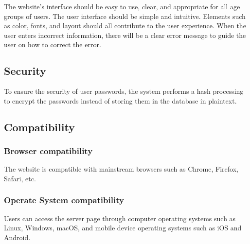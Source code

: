 \documentclass[conference]{IEEEtran}
\begin{document}
The website's interface should be easy to use, clear, and appropriate for all 
age groups of users. The user interface should be simple and intuitive. Elements 
such as color, fonts, and layout should all contribute to the user experience.
When the user enters incorrect information, there will be a clear error message 
to guide the user on how to correct the error.

\subsection{ Security }

To ensure the security of user passwords, the system performs a hash 
processing to encrypt the passwords instead of storing them in the database in 
plaintext.


\subsection{ Compatibility }


\subsubsection{ Browser compatibility }


The website is compatible with mainstream browsers such as Chrome, 
Firefox, Safari, etc.

\subsubsection{ Operate System compatibility }

Users can access the server page through computer operating systems 
such as Linux, Windows, macOS, and mobile device operating systems such 
as iOS and Android.
\end{document}
